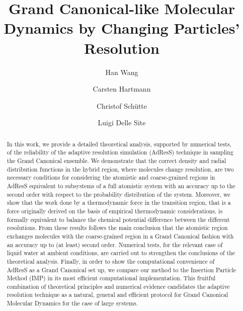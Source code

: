 \documentclass[aip,jcp,a4paper,reprint,onecolumn]{revtex4-1}
\begin{document}
\title{Grand Canonical-like Molecular Dynamics by Changing Particles' Resolution}
\author{Han Wang}
\author{Carsten Hartmann}
\author{Christof Sch\"utte}
\author{Luigi Delle Site}

\begin{abstract}
  In this work, we provide a detailed theoretical analysis, supported by numerical tests, of the
  reliability of the adaptive resolution simulation (AdResS) technique in sampling the Grand Canonical
  ensemble. We demonstrate that the correct density and radial distribution
  functions in the hybrid region, where molecules change resolution, are two necessary conditions for
  considering the atomistic and coarse-grained regions in AdResS equivalent to subsystems
  of a full atomistic system with an accuracy up to the second order with respect to the probability distribution of the system. Moreover, we show that the
  work done by a thermodynamic force in the transition region, that is a force originally derived on the basis of empirical thermodynamic considerations, is formally equivalent to balance the chemical
  potential difference between the different resolutions. From these results follows the main conclusion that the atomistic region exchanges
  molecules with the coarse-grained region in a Grand Canonical
  fashion with an accuracy up to (at least) second order. Numerical tests, for the relevant case of liquid water at ambient conditions, are carried out to strengthen the conclusions of the theoretical analysis.
  Finally, in order to show the computational convenience of AdResS as a Grand Canonical set up, we compare our method to the Insertion Particle Method (IMP) in its most efficient computational implementation.
  This fruitful combination of theoretical principles and numerical evidence candidates the adaptive resolution technique as a natural, general and efficient protocol for Grand Canonical Molecular Dynamics for the case of large systems.
\end{abstract}

\maketitle
\end{document}
